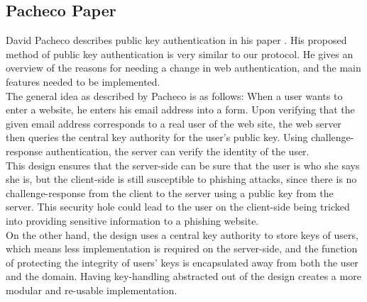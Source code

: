 \documentclass[11pt]{article}
\begin{document}
\subsection{Pacheco Paper}
David Pacheco describes public key authentication in his paper \cite{pacheco}. His proposed method of public key authentication is very similar to our protocol. He gives an overview of the reasons for needing a change in web authentication, and the main features needed to be implemented. \\
The general idea as described by Pacheco is as follows: When a user wants to enter a website, he enters his email address into a form. Upon verifying that the given email address corresponds to a real user of the web site, the web server then queries the central key authority for the user's public key. Using challenge-response authentication, the server can verify the identity of the user.\\
	This design ensures that the server-side can be sure that the user is who she says she is, but the client-side is still susceptible to phishing attacks, since there is no challenge-response from the client to the server using a public key from the server.  This security hole could lead to the user on the client-side being tricked into providing sensitive information to a phishing website.\\
	On the other hand, the design uses a central key authority to store keys of users, which means less implementation is required on the server-side, and the function of protecting the integrity of users' keys is encapsulated away from both the user and the domain.  Having key-handling abstracted out of the design creates a more modular and re-usable implementation.\\
\end{document}

